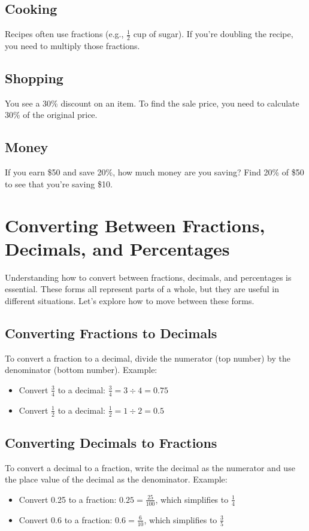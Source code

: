 \subsection{Cooking}
Recipes often use fractions (e.g., $\frac{1}{2}$ cup of sugar). If you’re doubling the recipe, you need to multiply those fractions.

\subsection{Shopping}
You see a 30\% discount on an item. To find the sale price, you need to calculate 30\% of the original price.

\subsection{Money}
If you earn \$50 and save 20\%, how much money are you saving? Find 20\% of \$50 to see that you’re saving \$10.

\section{Converting Between Fractions, Decimals, and Percentages}
Understanding how to convert between fractions, decimals, and percentages is essential. These forms all represent parts of a whole, but they are useful in different situations. Let's explore how to move between these forms.

\subsection{Converting Fractions to Decimals}
To convert a fraction to a decimal, divide the numerator (top number) by the denominator (bottom number). Example:
\begin{itemize}
    \item Convert $\frac{3}{4}$ to a decimal: $\frac{3}{4} = 3 \div 4 = 0.75$
    \item Convert $\frac{1}{2}$ to a decimal: $\frac{1}{2} = 1 \div 2 = 0.5$
\end{itemize}

\subsection{Converting Decimals to Fractions}
To convert a decimal to a fraction, write the decimal as the numerator and use the place value of the decimal as the denominator. Example:
\begin{itemize}
    \item Convert 0.25 to a fraction: $0.25 = \frac{25}{100}$, which simplifies to $\frac{1}{4}$
    \item Convert 0.6 to a fraction: $0.6 = \frac{6}{10}$, which simplifies to $\frac{3}{5}$
\end{itemize}

